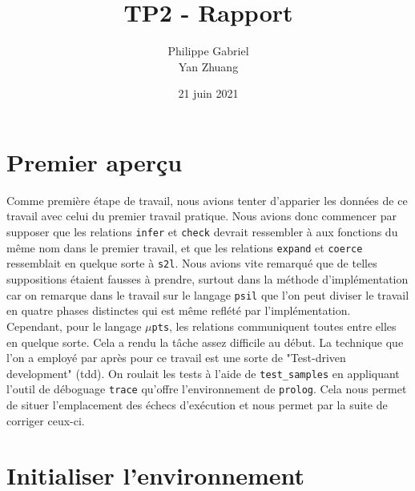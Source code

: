 \documentclass[10pt, titlepage]{article}
\begin{document}
\title{{\Huge \textbf{TP2 - Rapport}}}
\author{Philippe Gabriel \\ Yan Zhuang}
\date{21 juin 2021}

\maketitle

\setcounter{page}{2}

\newpage

\section{Premier aperçu}
Comme première étape de travail, nous avions tenter d'apparier les données de
ce travail avec celui du premier travail pratique. Nous avions donc commencer
par supposer que les relations \texttt{infer} et \texttt{check} devrait
ressembler à aux fonctions du même nom dans le premier travail, et que les
relations \texttt{expand} et \texttt{coerce} ressemblait en quelque sorte à
\texttt{s2l}. Nous avions vite remarqué que de telles suppositions étaient
fausses à prendre, surtout dans la méthode d'implémentation car on remarque
dans le travail sur le langage \texttt{psil} que l'on peut diviser le travail
en quatre phases distinctes qui est même reflété par l'implémentation.
Cependant, pour le langage $\mu$\texttt{pts}, les relations communiquent toutes
entre elles en quelque sorte. Cela a rendu la tâche assez difficile au début.
La technique que l'on a employé par après pour ce travail est une sorte de
"Test-driven development" (tdd). On roulait les tests à l'aide de
\texttt{test\_samples} en appliquant l'outil de déboguage \texttt{trace}
qu'offre l'environnement de \texttt{prolog}. Cela nous permet de situer
l'emplacement des échecs d'exécution et nous permet par la suite de
corriger ceux-ci.

\section{Initialiser l'environnement}
\end{document}

